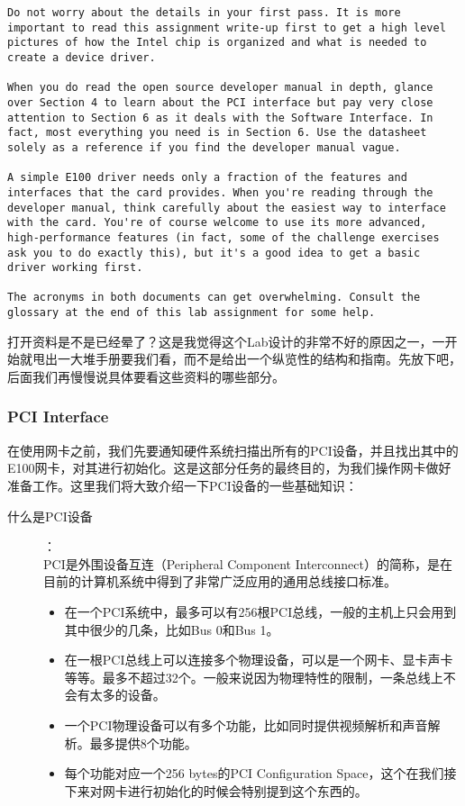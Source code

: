 \documentclass{article}
\begin{document}
\begin{CJK*}{UTF8}{gkai}
\begin{lstlisting}[style=exercise]
Do not worry about the details in your first pass. It is more important to read this assignment write-up first to get a high level pictures of how the Intel chip is organized and what is needed to create a device driver.

When you do read the open source developer manual in depth, glance over Section 4 to learn about the PCI interface but pay very close attention to Section 6 as it deals with the Software Interface. In fact, most everything you need is in Section 6. Use the datasheet solely as a reference if you find the developer manual vague.

A simple E100 driver needs only a fraction of the features and interfaces that the card provides. When you're reading through the developer manual, think carefully about the easiest way to interface with the card. You're of course welcome to use its more advanced, high-performance features (in fact, some of the challenge exercises ask you to do exactly this), but it's a good idea to get a basic driver working first.

The acronyms in both documents can get overwhelming. Consult the glossary at the end of this lab assignment for some help.
\end{lstlisting}


打开资料是不是已经晕了？这是我觉得这个Lab设计的非常不好的原因之一，一开始就甩出一大堆手册要我们看，而不是给出一个纵览性的结构和指南。先放下吧，后面我们再慢慢说具体要看这些资料的哪些部分。


\subsubsection{PCI Interface}

在使用网卡之前，我们先要通知硬件系统扫描出所有的PCI设备，并且找出其中的E100网卡，对其进行初始化。这是这部分任务的最终目的，为我们操作网卡做好准备工作。这里我们将大致介绍一下PCI设备的一些基础知识：

\begin{description}
\item[什么是PCI设备]：\\

PCI是外围设备互连（Peripheral Component Interconnect）的简称，是在目前的计算机系统中得到了非常广泛应用的通用总线接口标准。

\begin{itemize}
\item{在一个PCI系统中，最多可以有256根PCI总线，一般的主机上只会用到其中很少的几条，比如Bus 0和Bus 1。}
\item{在一根PCI总线上可以连接多个物理设备，可以是一个网卡、显卡声卡等等。最多不超过32个。一般来说因为物理特性的限制，一条总线上不会有太多的设备。}
\item{一个PCI物理设备可以有多个功能，比如同时提供视频解析和声音解析。最多提供8个功能。}
\item{每个功能对应一个256 bytes的PCI Configuration Space，这个在我们接下来对网卡进行初始化的时候会特别提到这个东西的。}
\end{itemize}



\end{description}
\end{CJK*}
\end{document}
